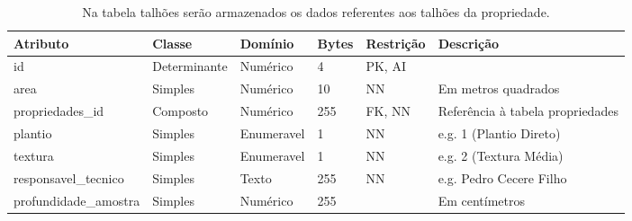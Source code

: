 \begin{landscape}
    \begin{table}[H]
        \centering
        \caption[Tabela talhões]{Na tabela talhões serão armazenados os dados referentes aos talhões da propriedade.
            \label{tab:tabela-er-talhoes}}
        \begin{tabular}{|p{4cm}|p{3cm}|p{2cm}|p{1cm}|p{2cm}|p{8cm}|}
            \hline
            Atributo              & Classe       & Domínio    & Bytes & Restrição & Descrição                        \\\hline
            id                    & Determinante & Numérico   & 4     & PK, AI    &                                  \\\hline
            area                  & Simples      & Numérico   & 10    & NN        & Em metros quadrados              \\\hline
            propriedades\_id      & Composto     & Numérico   & 255   & FK, NN    & Referência à tabela propriedades \\\hline
            plantio               & Simples      & Enumeravel & 1     & NN        & e.g. 1 (Plantio Direto)          \\\hline
            textura               & Simples      & Enumeravel & 1     & NN        & e.g. 2 (Textura Média)           \\\hline
            responsavel\_tecnico  & Simples      & Texto      & 255   & NN        & e.g. Pedro Cecere Filho          \\\hline
            profundidade\_amostra & Simples      & Numérico   & 255   &           & Em centímetros                   \\\hline
        \end{tabular}
    \end{table}

    \label{sec:titSubSecAnalises}


\end{landscape}

